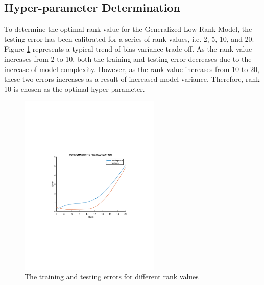 \documentclass[a4paper]{article}
\begin{document}
\subsection{Hyper-parameter Determination}
To determine the optimal rank value for the Generalized Low Rank Model, the testing error has been calibrated for a series of rank values, i.e. 2, 5, 10, and 20. Figure \ref{fig:rank} represents a typical trend of bias-variance trade-off. As the rank value increases from 2 to 10, both the training and testing error decreases due to the increase of model complexity. However, as the rank value increases from 10 to 20, these two errors increases as a result of increased model variance. Therefore, rank 10 is chosen as the optimal hyper-parameter.
\begin{figure}
\centering
\includegraphics[width=0.6\textwidth]{PURE_QUADRATIC_REGULARIZATION.pdf}
\caption{\label{fig:rank}The training and testing errors for different rank values}
\end{figure}
\end{document}
